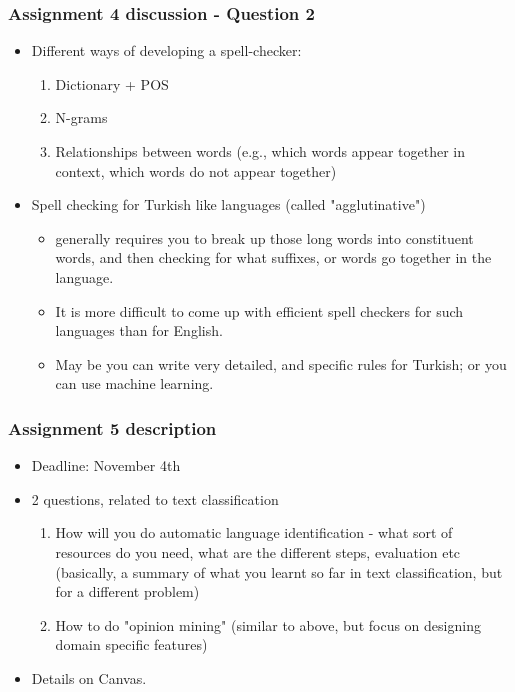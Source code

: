 \documentclass{beamer}
\begin{document}
\begin{frame}
\frametitle{Assignment 4 discussion - Question 2}
\begin{itemize}
\item Different ways of developing a spell-checker:
\begin{enumerate}
\item Dictionary + POS
\item N-grams
\item Relationships between words (e.g., which words appear together in context, which words do not appear together)
\end{enumerate} \pause
\item Spell checking for Turkish like languages (called "agglutinative")
\begin{itemize}
\item generally requires you to break up those long words into constituent words, and then checking for what suffixes, or words go together in the language.
\item It is more difficult to come up with efficient spell checkers for such languages than for English. 
\item May be you can write very detailed, and specific rules for Turkish; or you can use machine learning. 
\end{itemize}
\end{itemize}
\end{frame}

\begin{frame}
\frametitle{Assignment 5 description}
\begin{itemize}
\item Deadline: November 4th
\item 2 questions, related to text classification
\begin{enumerate}
\item How will you do automatic language identification - what sort of resources do you need, what are the different steps, evaluation etc (basically, a summary of what you learnt so far in text classification, but for a different problem) 
\item How to do "opinion mining" (similar to above, but focus on designing domain specific features)
\end{enumerate}
\item Details on Canvas. 
\end{itemize}
\end{frame}
\end{document}
